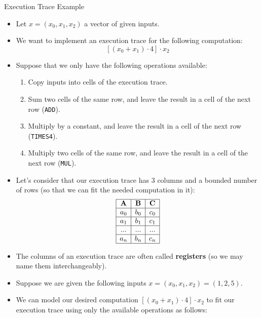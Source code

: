 \begin{frame}[allowframebreaks]{Execution Trace Example}
\begin{itemize}
\item Let $x=(x_0, x_1, x_2)$ a vector of given inputs.
\item We want to implement an execution trace for the following computation:
$$[(x_0+x_1)\cdot4]\cdot x_2$$
\item Suppose that we only have the following operations available:
  \begin{enumerate}
  \item Copy inputs into cells of the execution trace.
  \item Sum two cells of the same row, and leave the result in a cell of the next row (\texttt{ADD}).
  \item Multiply by a constant, and leave the result in a cell of the next row (\texttt{TIMES4}).
  \item Multiply two cells of the same row, and leave the result in a cell of the next row (\texttt{MUL}).
  \end{enumerate}
\item Let's consider that our execution trace has $3$ columns and a bounded number of rows (so that we can fit the needed computation in it):
$$
\begin{array}{|c|c|c|}
\hline
\textbf{A} & \textbf{B} & \textbf{C} \\ \hline
a_0 & b_0 & c_0 \\ \hline
a_1 & b_1 & c_1 \\ \hline
... & ... & ...\\ \hline
a_n & b_n & c_n \\ \hline
\end{array}
$$
\item The columns of an execution trace are often called \textbf{registers} (so we may name them interchangeably).
\end{itemize}


\framebreak
\begin{itemize}
\item Suppose we are given the following inputs $x=(x_0, x_1, x_2)=(1,2,5)$.
\item We can model our desired computation $[(x_0+x_1)\cdot4]\cdot x_2$ to fit our execution trace using only the available operations as follows:
\end{itemize}

\vspace{0.3cm}
\begin{large}
\begin{table}[h!]
\centering


\end{table}
\end{large}
\end{frame}
